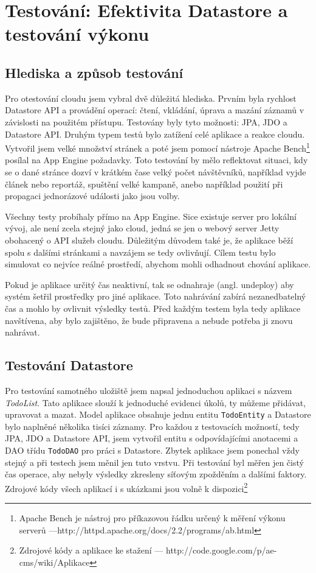 \chapter{Testování: Efektivita Datastore a testování výkonu}

\section{Hlediska a způsob testování}
Pro otestování cloudu jsem vybral dvě důležitá hlediska. Prvním byla rychlost Datastore API a provádění operací: čtení, vkládání, úprava a mazání záznamů v závislosti na použitém přístupu. Testovány byly tyto možnosti: JPA, JDO a Datastore API. Druhým typem testů bylo zatížení celé aplikace a reakce cloudu. Vytvořil jsem velké množství stránek a poté jsem pomocí nástroje Apache Bench\footnote{Apache Bench je nástroj pro příkazovou řádku určený k měření výkonu serverů ---http://httpd.apache.org/docs/2.2/programs/ab.html}  posílal na App Engine požadavky. Toto testování by mělo reflektovat situaci, kdy se o dané stránce dozví v krátkém čase velký počet návštěvníků, například vyjde článek nebo reportáž, spuštění velké kampaně, anebo například použití při propagaci jednorázové události jako jsou volby.

Všechny testy probíhaly přímo na App Engine. Sice existuje server pro lokální vývoj, ale není zcela stejný jako cloud, jedná se jen o webový server Jetty obohacený o API služeb cloudu. Důležitým důvodem také je, že aplikace běží spolu s dalšími stránkami a navzájem se tedy ovlivňují. Cílem testu bylo simulovat co nejvíce reálné prostředí, abychom mohli odhadnout chování aplikace.  

Pokud je aplikace určitý čas neaktivní, tak se odnahraje (angl. undeploy) aby systém šetřil prostředky pro jiné aplikace. Toto nahrávání zabírá nezanedbatelný čas a mohlo by ovlivnit výsledky testů. Před každým testem byla tedy aplikace navštívena, aby bylo zajištěno, že bude připravena a nebude potřeba ji znovu nahrávat.

\section{Testování Datastore}
Pro testování samotného uložiště jsem napsal jednoduchou aplikaci s názvem \emph{TodoList}. Tato aplikace slouží k jednoduché evidenci úkolů, ty můžeme přidávat, upravovat a mazat. Model aplikace obsahuje jednu entitu \verb|TodoEntity| a Datastore bylo naplněné několika tisíci záznamy. Pro každou z testovacích možností, tedy JPA, JDO a Datastore API, jsem vytvořil entitu s odpovídajícími anotacemi a DAO třídu \verb|TodoDAO| pro práci s Datastore. Zbytek aplikace jsem ponechal vždy stejný a při testech jsem měnil jen tuto vrstvu. Při testování byl měřen jen čistý čas operace, aby nebyly výsledky zkresleny síťovým zpožděním a dalšími faktory. Zdrojové kódy všech aplikací i s ukázkami jsou volně k dispozici\footnote{Zdrojové kódy a aplikace ke stažení  --- http://code.google.com/p/ae-cms/wiki/Aplikace}

